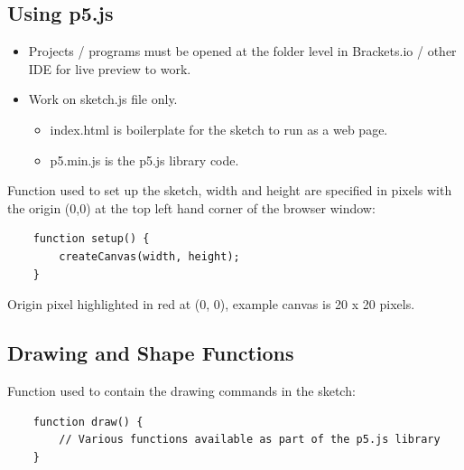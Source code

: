 \documentclass{article}
\begin{document}
\subsection*{Using p5.js}
\begin{itemize}
    \item Projects / programs must be opened at the folder level in Brackets.io / other IDE for live preview to work.
    \item Work on sketch.js file only. 
        \begin{itemize}
            \item index.html is boilerplate for the sketch to run as a web page.
            \item p5.min.js is the p5.js library code.
        \end{itemize}
\end{itemize}

\vspace*{0.5cm}
\noindent Function used to set up the sketch, width and height are specified in pixels with the origin (0,0) at the top left hand corner of the browser window:

\vspace*{0.25cm}
\begin{verbatim}
    function setup() {
        createCanvas(width, height);
    }
    \end{verbatim}


\begin{center}

\vspace*{0.5cm}
Origin pixel highlighted in red at (0, 0), example canvas is 20 x 20 pixels.
\end{center}

\newpage
\subsection*{Drawing and Shape Functions}
\noindent Function used to contain the drawing commands in the sketch:
\begin{verbatim}
    function draw() {
        // Various functions available as part of the p5.js library
    }
    \end{verbatim}
\end{document}
